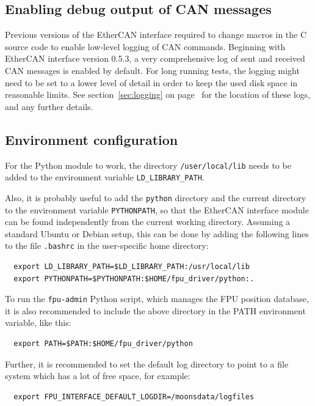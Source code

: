 \documentclass[11pt,a4paper]{report}
\begin{document}
\subsection{Enabling debug output of CAN messages}

Previous versions of the EtherCAN interface required to change macros in the C
source code to enable low-level logging of CAN commands.  Beginning
with EtherCAN interface version 0.5.3, a very comprehensive log of sent and
received CAN messages is enabled by default. For long running tests,
the logging might need to be set to a lower level of detail in order
to keep the used disk space in reasonable limits.  See
section~\ref{sec:logging} on page~\pageref{sec:logging} for the
location of these logs, and any further details.


\subsection{Environment configuration}

For the Python module to work, the directory \texttt{/user/local/lib}
needs to be added to the environment variable
\texttt{LD\_LIBRARY\_PATH}.

Also, it is probably useful to add the \texttt{python} directory and
the current directory to the environment variable \texttt{PYTHONPATH},
so that the EtherCAN interface module can be found independently from the current
working directory.  Assuming a standard Ubuntu or Debian setup, this
can be done by adding the following lines to the file \texttt{.bashrc}
in the user-specific home directory:

\begin{verbatim}
  export LD_LIBRARY_PATH=$LD_LIBRARY_PATH:/usr/local/lib
  export PYTHONPATH=$PYTHONPATH:$HOME/fpu_driver/python:.
\end{verbatim}

To run the \texttt{fpu-admin} Python script, which manages the FPU
position database, it is also recommended to include the above
directory in the PATH environment variable, like this:

\begin{verbatim}
  export PATH=$PATH:$HOME/fpu_driver/python
\end{verbatim}

 
Further, it is recommended to set the default log directory to point
to a file system which has a lot of free space, for example:
\begin{verbatim}
  export FPU_INTERFACE_DEFAULT_LOGDIR=/moonsdata/logfiles
\end{verbatim}
\end{document}
